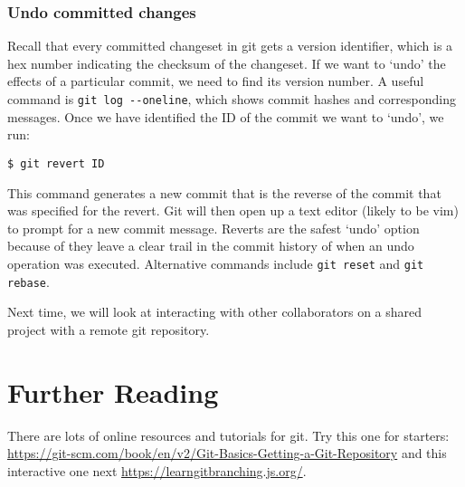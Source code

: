 \documentclass{article}
\begin{document}
\subsubsection*{Undo committed changes}
Recall that every committed changeset in git gets a version identifier, which is a hex number indicating the checksum of the changeset.
If we want to `undo' the effects of a particular commit, we need to find its
version number.
A useful command is \lstinline{git log --oneline}, which shows commit hashes and corresponding messages. Once we have identified the ID of the commit we want to `undo', we run:
\begin{lstlisting}[style=BashInputStyle]
    $ git revert ID
\end{lstlisting}

This command generates a new commit that is the reverse of the commit that was specified for the revert. Git will then open up a text editor (likely to be vim) to prompt for a new commit message. Reverts are the safest `undo' option because of they leave a clear trail in the commit history of when an undo operation was executed. Alternative commands include
\lstinline{git reset} and \lstinline{git rebase}.

Next time, we will look at interacting with other collaborators on a shared
project with a remote git repository.


\section*{Further Reading}

There are lots of online resources and tutorials for git.
Try this one for starters: \url{https://git-scm.com/book/en/v2/Git-Basics-Getting-a-Git-Repository} and this interactive one next
\url{https://learngitbranching.js.org/}.
\end{document}
